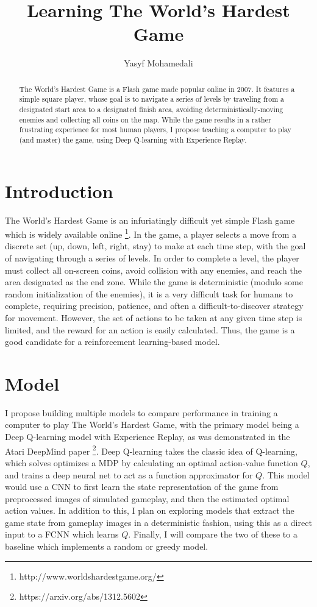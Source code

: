 \documentclass[preprint,12pt]{elsarticle}
\begin{document}
\begin{frontmatter}
\title{Learning The World's Hardest Game}

\author{Yasyf Mohamedali}

\address{6.867 Project Proposal}

\begin{abstract}
The World's Hardest Game is a Flash game made popular online in 2007. It features a simple square player, whose goal is to navigate a series of levels by traveling from a designated start area to a designated finish area, avoiding deterministically-moving enemies and collecting all coins on the map. While the game results in a rather frustrating experience for most human players, I propose teaching a computer to play (and master) the game, using Deep Q-learning with Experience Replay.
\end{abstract}
\end{frontmatter}

\section{Introduction}

The World's Hardest Game is an infuriatingly difficult yet simple Flash game which is widely available online \footnote{http://www.worldshardestgame.org/}. In the game, a player selects a move from a discrete set (up, down, left, right, stay) to make at each time step, with the goal of navigating through a series of levels. In order to complete a level, the player must collect all on-screen coins, avoid collision with any enemies, and reach the area designated as the end zone. While the game is deterministic (modulo some random initialization of the enemies), it is a very difficult task for humans to complete, requiring precision, patience, and often a difficult-to-discover strategy for movement. However, the set of actions to be taken at any given time step is limited, and the reward for an action is easily calculated. Thus, the game is a good candidate for a reinforcement learning-based model.

\section{Model}

I propose building multiple models to compare performance in training a computer to play The World's Hardest Game, with the primary model being a Deep Q-learning model with Experience Replay, as was demonstrated in the Atari DeepMind paper \footnote{https://arxiv.org/abs/1312.5602}. Deep Q-learning takes the classic idea of Q-learning, which solves optimizes a MDP by calculating an optimal action-value function $Q$, and trains a deep neural net to act as a function approximator for $Q$. This model would use a CNN to first learn the state representation of the game from preprocessed images of simulated gameplay, and then the estimated optimal action values. In addition to this, I plan on exploring models that extract the game state from gameplay images in a deterministic fashion, using this as a direct input to a FCNN which learns $Q$. Finally, I will compare the two of these to a baseline which implements a random or greedy model.
\end{document}
